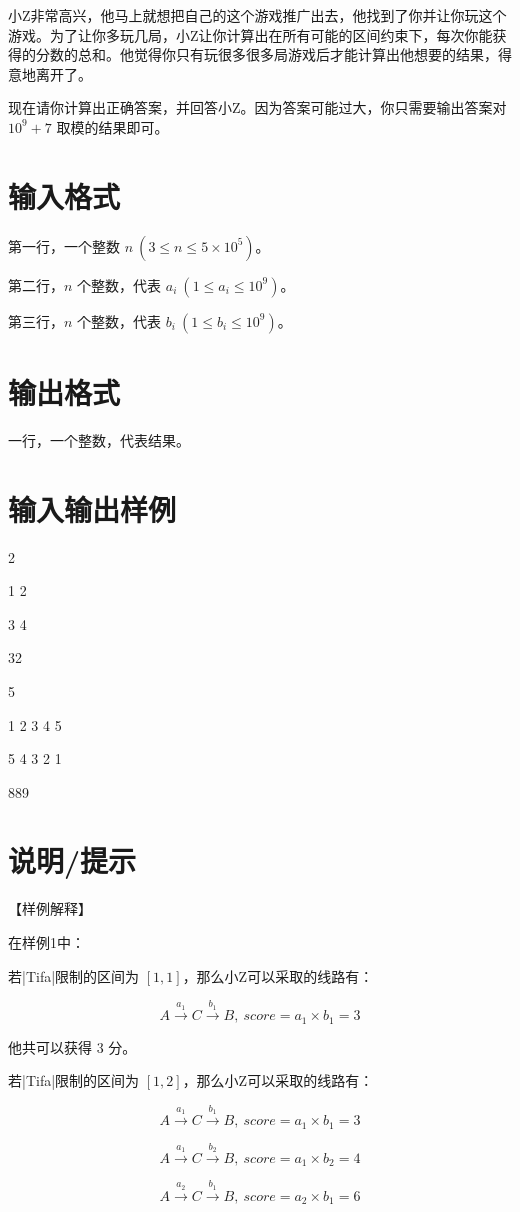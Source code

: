 \documentclass{ctpro}
\begin{document}
小Z非常高兴，他马上就想把自己的这个游戏推广出去，他找到了你并让你玩这个游戏。为了让你多玩几局，小Z让你计算出在所有可能的区间约束下，每次你能获得的分数的总和。他觉得你只有玩很多很多局游戏后才能计算出他想要的结果，得意地离开了。

现在请你计算出正确答案，并回答小Z。因为答案可能过大，你只需要输出答案对 $10^9 + 7$ 取模的结果即可。

\section*{输入格式}
第一行，一个整数 $n~(3 \leq n \leq 5 \times 10^5)$。

第二行，$n$ 个整数，代表 $a_i~(1 \leq a_i \leq 10^9)$。

第三行，$n$ 个整数，代表 $b_i~(1 \leq b_i \leq 10^9)$。

\section*{输出格式}
一行，一个整数，代表结果。

\section*{输入输出样例}
\testcasetab
{
	2\par
	1 2\par
	3 4
}
{
	32
}

\testcasetab
{
	5\par
	1 2 3 4 5\par
	5 4 3 2 1
}
{
	889
}

\section*{说明/提示}
【样例解释】

在样例1中：

若|Tifa|限制的区间为 $[1,1]$，那么小Z可以采取的线路有：

$$A \stackrel{a_1}{\rightarrow} C \stackrel{b_1}{\rightarrow} B,~score=a_1 \times b_1=3$$

他共可以获得 $3$ 分。

若|Tifa|限制的区间为 $[1,2]$，那么小Z可以采取的线路有：

$$A \stackrel{a_1}{\rightarrow} C \stackrel{b_1}{\rightarrow} B,~score=a_1 \times b_1=3$$

$$A \stackrel{a_1}{\rightarrow} C \stackrel{b_2}{\rightarrow} B,~score=a_1 \times b_2=4$$

$$A \stackrel{a_2}{\rightarrow} C \stackrel{b_1}{\rightarrow} B,~score=a_2 \times b_1=6$$
\end{document}
